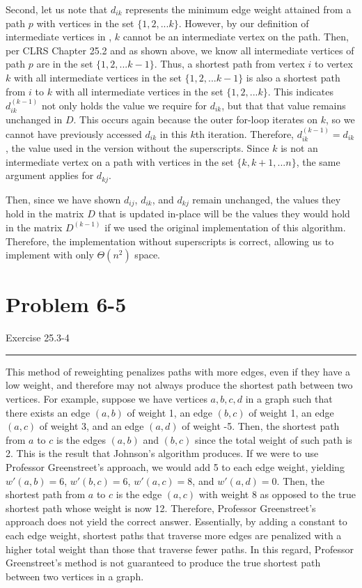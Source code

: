 \documentclass[11pt]{article}
\def\separateline{\medskip\hrule\medskip}
\begin{document}
Second, let us note that $d_{ik}$ represents the minimum edge weight attained from a path $p$ with vertices in the set $\{1,2,...k\}$. However, by our definition of intermediate vertices in , $k$ cannot be an intermediate vertex on the path. Then, per CLRS Chapter 25.2 and as shown above, we know all intermediate vertices of path $p$ are in the set $\{1,2,...k-1\}$. Thus, a shortest path from vertex $i$ to vertex $k$ with all intermediate vertices in the set $\{1,2,...k-1\}$ is also a shortest path from $i$ to $k$ with all intermediate vertices in the set $\{1,2,...k\}$. This indicates $d_{ik}^{(k-1)}$ not only holds the value we require for $d_{ik}$, but that that value remains unchanged in $D$. This occurs again because the outer for-loop iterates on $k$, so we cannot have previously accessed $d_{ik}$ in this $k$th iteration. Therefore, $d_{ik}^{(k-1)} = d_{ik}$, the value used in the version without the superscripts. Since $k$ is not an intermediate vertex on a path with vertices in the set $\{k,k+1,...n\}$, the same argument applies for $d_{kj}$.

Then, since we have shown $d_{ij}$, $d_{ik}$, and $d_{kj}$ remain unchanged, the values they hold in the matrix $D$ that is updated in-place will be the values they would hold in the matrix $D^{(k-1)}$ if we used the original implementation of this algorithm. Therefore, the implementation without superscripts is correct, allowing us to implement  with only $\Theta(n^2)$ space.

\newpage


\section{Problem 6-5}
Exercise 25.3-4
\separateline

This method of reweighting penalizes paths with more edges, even if they have a low weight, and therefore may not always produce the shortest path between two vertices. For example, suppose we have vertices $a,b,c,d$ in a graph such that there exists an edge $(a,b)$ of weight 1, an edge $(b,c)$ of weight 1, an edge $(a,c)$ of weight 3, and an edge $(a,d)$ of weight -5. Then, the shortest path from $a$ to $c$ is the edges $(a,b)$ and $(b,c)$ since the total weight of such path is 2. This is the result that Johnson's algorithm produces. If we were to use Professor Greenstreet's approach, we would add 5 to each edge weight, yielding $w'(a,b) = 6$, $w'(b,c) = 6$, $w'(a,c) = 8$, and $w'(a,d) = 0$. Then, the shortest path from $a$ to $c$ is the edge $(a,c)$ with weight 8 as opposed to the true shortest path whose weight is now 12. Therefore, Professor Greenstreet's approach does not yield the correct answer. Essentially, by adding a constant to each edge weight, shortest paths that traverse more edges are penalized with a higher total weight than those that traverse fewer paths. In this regard, Professor Greenstreet's method is not guaranteed to produce the true shortest path between two vertices in a graph.
\end{document}
